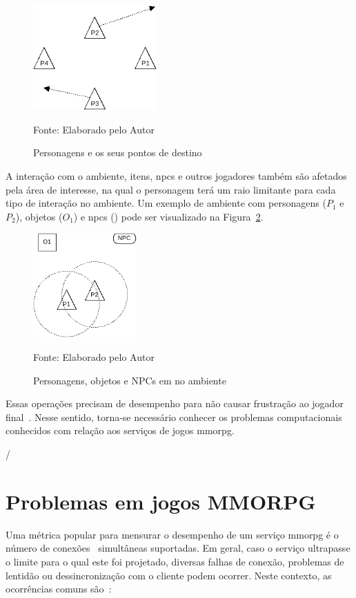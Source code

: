 \begin{figure}[htb!]
\caption{Personagens e os seus pontos de destino}
\label{fig:walk}
\includegraphics[height=4cm]{img/cap2/walk.png}
\centering

Fonte: Elaborado pelo Autor
\end{figure}



A interação com o ambiente, itens, \ac{npcs} e outros jogadores também são afetados pela área de interesse, na qual o personagem terá um raio limitante para cada tipo de interação no ambiente.
%
Um exemplo de ambiente com personagens ($P_1$ e $P_2$), objetos ($O_1$) e \ac{npcs} () pode ser visualizado na Figura~\ref{fig:obj_e_npc1}.

\begin{figure}[htb!]
\caption{Personagens, objetos e NPCs em no ambiente}
\label{fig:obj_e_npc1}
\includegraphics[height=4cm]{img/cap2/obj_e_npc1.png}
\centering

Fonte: Elaborado pelo Autor
\end{figure}



Essas operações precisam de desempenho para não causar frustração ao jogador final~\cite{7008965}.
%
Nesse sentido, torna-se necessário conhecer os problemas computacionais conhecidos com relação aos serviços de jogos \ac{mmorpg}.


/
\section{Problemas em jogos MMORPG}
\label{sec:problemas}

Uma métrica popular para mensurar o desempenho de um serviço \ac{mmorpg} é o número de conexões~\cite{1417630} simultâneas suportadas.
%
Em geral, caso o serviço ultrapasse o limite para o qual este foi projetado, diversas falhas de conexão, problemas de lentidão ou dessincronização com o cliente podem ocorrer.
%
Neste contexto, as ocorrências comuns são~\cite{1417630}:

